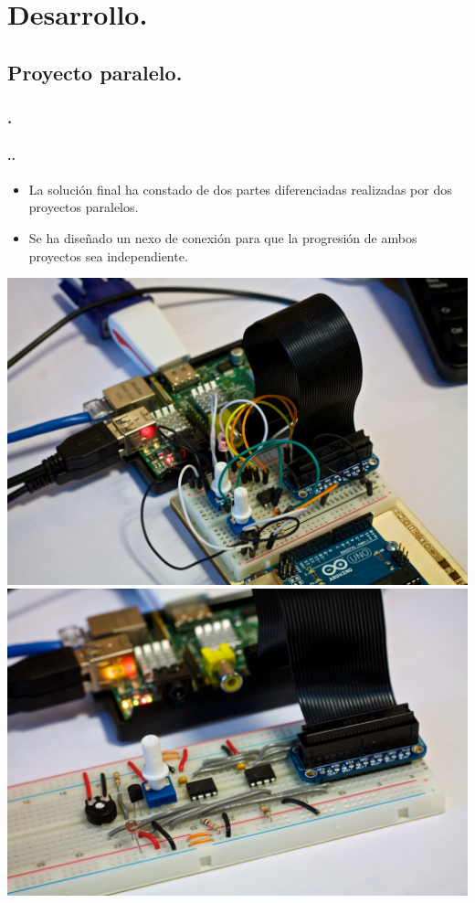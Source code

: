 \documentclass{beamer}
\newenvironment{slide}	%
{\begin{frame}[environment=slide]
\frametitle{\insertsectionnumber.\insertsection}
\framesubtitle{\setlength{\parindent}{2ex} \insertsectionnumber.\insertsubsectionnumber.\insertsubsection}}
{\end{frame}}
\begin{document}
\section{Desarrollo.}
\subsection{Proyecto paralelo.}
\begin{slide}
	\begin{itemize}
		\item La solución final ha constado de dos partes diferenciadas realizadas por dos proyectos paralelos.
		\item Se ha diseñado un nexo de conexión para que la progresión de ambos proyectos sea independiente.
	\end{itemize}
	\begin{center}
		\includegraphics[scale=0.114]{proto1.png}
	\hfill	
		\includegraphics[scale=0.114]{proto2.png}
	\end{center}
\end{slide}
\end{document}
